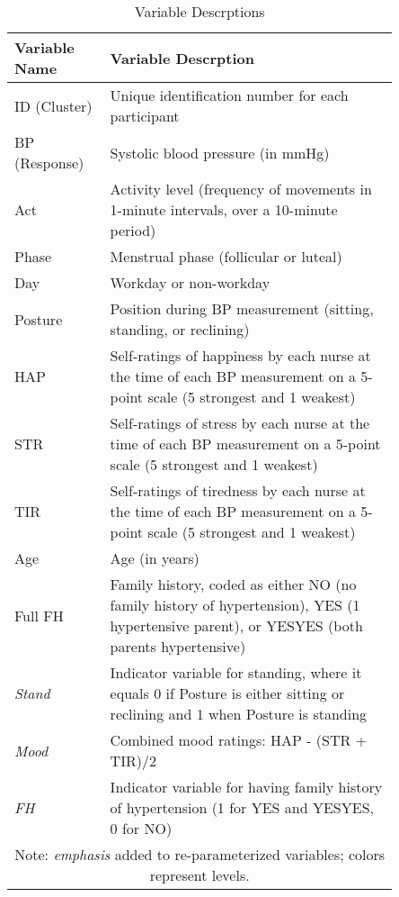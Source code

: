 \documentclass[12pt,twoside,leqno,fleqn,letterpaper]{article}
\theoremstyle{definition}
\theoremstyle{definition}
\begin{document}
\begin{table}[H]
    \centering\begin{tabular}{|p{0.2\linewidth} | p{0.65\linewidth}|}
        \hline
        Variable Name & Variable Descrption \\
        \hline\hline
        ID (Cluster) & Unique identification number for each participant \\
        \hline
        BP (Response) & Systolic blood pressure (in mmHg) \\
        \hline
        \textcolor[RGB]{208, 2, 27}{Act} & Activity level (frequency of movements in 1-minute intervals, over a 10-minute period) \\
        \hline
        \textcolor[RGB]{74, 144, 226}{Phase} & Menstrual phase (follicular or luteal) \\
        \hline
        \textcolor[RGB]{74, 144, 226}{Day} & Workday or non-workday \\
        \hline
        \textcolor[RGB]{208, 2, 27}{Posture} & Position during BP measurement (sitting, standing, or reclining) \\
        \hline
        \textcolor[RGB]{208, 2, 27}{HAP} & Self-ratings of happiness by each nurse at the time of each BP measurement on a 5-point scale (5 strongest and 1 weakest) \\
        \hline
        \textcolor[RGB]{208, 2, 27}{STR} & Self-ratings of stress by each nurse at the time of each BP measurement on a 5-point scale (5 strongest and 1 weakest) \\
        \hline
        \textcolor[RGB]{208, 2, 27}{TIR} & Self-ratings of tiredness by each nurse at the time of each BP measurement on a 5-point scale (5 strongest and 1 weakest) \\
        \hline
        \textcolor[RGB]{74, 144, 226}{Age} & Age (in years) \\
        \hline
        \textcolor[RGB]{74, 144, 226}{Full FH} & Family history, coded as either NO (no family history of  hypertension), YES (1 hypertensive parent), or YESYES (both parents hypertensive) \\
        \hline\hline
        \emph{\textcolor[RGB]{208, 2, 27}{Stand}} & Indicator variable for standing, where it equals 0 if Posture is either sitting or reclining and 1 when Posture is standing \\
        \hline
        \emph{\textcolor[RGB]{208, 2, 27}{Mood}} & Combined mood ratings: HAP - (STR + TIR)/2 \\
        \hline
        \emph{\textcolor[RGB]{74, 144, 226}{FH}} & Indicator variable for having family history of hypertension (1 for YES and YESYES, 0 for NO) \\
        \hline
        \multicolumn{2}{c}{\footnotesize Note: \emph{emphasis} added to re-parameterized variables; colors represent levels.}
    \end{tabular}
    \caption{Variable Descrptions}
    \label{tab: var desc}
\end{table}
\end{document}
